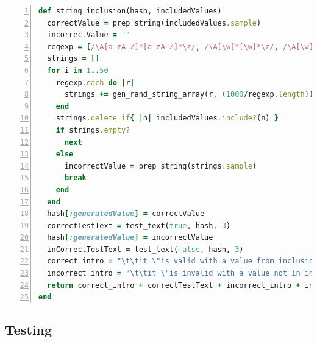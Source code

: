 \documentclass[a4paper,12pt]{article}
\begin{document}
\begin{lstlisting}[frame=single,numbers=left,language = ruby,caption= {generate\_tests\_for\_table}, label={code:strinc}]
def string_inclusion(hash, includedValues)
  correctValue = prep_string(includedValues.sample)
  incorrectValue = ""
  regexp = [/\A[a-zA-Z]*[a-zA-Z]*\z/, /\A[\w]*[\w]*\z/, /\A[\w]*[[:punct:]]*[\w]*\z/, /\A[\w]*[[:print:]]*[a-zA-Z]*\z/]
  strings = []
  for i in 1..50
    regexp.each do |r|
      strings += gen_rand_string_array(r, (1000/regexp.length))
    end
    strings.delete_if{ |n| includedValues.include?(n) }
    if strings.empty?
      next
    else
      incorrectValue = prep_string(strings.sample)
      break
    end
  end
  hash[:generatedValue] = correctValue
  correctTestText = test_text(true, hash, 3)
  hash[:generatedValue] = incorrectValue
  inCorrectTestText = test_text(false, hash, 3)
  correct_intro = "\t\tit \"is valid with a value from inclusion\" do\n"
  incorrect_intro = "\t\tit \"is invalid with a value not in inclusion\" do\n"
  return correct_intro + correctTestText + incorrect_intro + inCorrectTestText 
end
\end{lstlisting}

\subsection{Testing}
\end{document}
